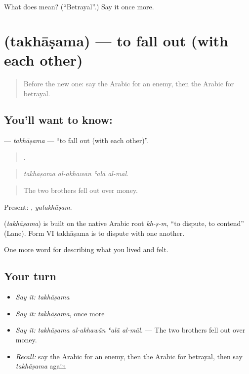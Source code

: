 \begin{tcolorbox}[breakable,colback=teal!4,colframe=teal!35!black,title={Before you move on}]
What does  mean? (\textquotedblleft{}Betrayal\textquotedblright{}.) Say it once more.
\end{tcolorbox}
\section[\texorpdfstring{\ar{تخاصم} (takhāṣama)}{تخاصم (takhāṣama)}]{ (takhāṣama) — to fall out (with each other)}

\label{lesson:AR-C535-takhasama}



\begin{quote}
Before the new one: say the Arabic for an enemy, then the Arabic for betrayal.
\end{quote}

\subsection*{You'll want to know: }
\textbf{} — \emph{takhāṣama} — \textquotedblleft{}to fall out (with each other)\textquotedblright{}.

\begin{quote}
   .
\end{quote}

\begin{quote}
\emph{takhāṣama al-akhawān ʿalā al-māl.}
\end{quote}

\begin{quote}
The two brothers fell out over money.
\end{quote}

Present: , \emph{yatakhāṣam}.

\begin{cousinweb}
\textbf{} (\emph{takhāṣama}) is built on the native Arabic root \emph{kh-ṣ-m}, \textquotedblleft{}to dispute, to contend\textquotedblright{} (Lane). Form VI takhāṣama is to dispute with one another.
\end{cousinweb}

\begin{grammarlens}[title={What you've built}]
One more word for describing what you lived and felt.
\end{grammarlens}

\subsection*{Your turn}
\begin{itemize}
\raggedright
  \item \emph{Say it:} \emph{takhāṣama}
  \item \emph{Say it:} \emph{takhāṣama}, once more
  \item \emph{Say it:} \emph{takhāṣama al-akhawān ʿalā al-māl.} — The two brothers fell out over money.
  \item \emph{Recall:} say the Arabic for an enemy, then the Arabic for betrayal, then say \emph{takhāṣama} again
\end{itemize}

